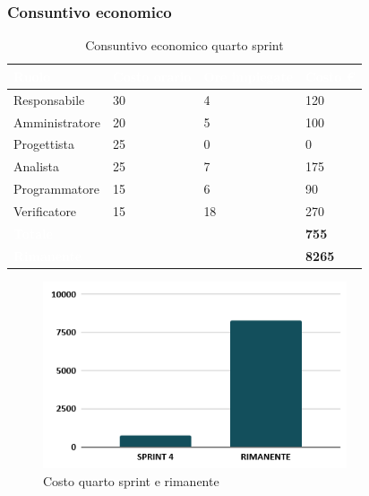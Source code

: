 \newpage
\subsubsection{Consuntivo economico}
{
\setlength{\tabcolsep}{10pt}
\renewcommand{\arraystretch}{1.5}
\begin{table}[h]
    \centering
    \begin{tabularx}{\textwidth}{| l | l | l | X |}
        \hline
        \rowcolor{headerrow} \textbf{\textcolor{white}{Ruolo}} & \textbf{\textcolor{white}{Costo orario}} & \textbf{\textcolor{white}{Ore impiegate}} & \textbf{\textcolor{white}{Costo €}} \\
        \hline
        Responsabile & 30 & 4 & 120\\
        \hline
        Amministratore & 20 & 5 & 100\\
        \hline
        Progettista & 25 & 0 & 0\\
        \hline
        Analista & 25 & 7 & 175\\
        \hline
        Programmatore & 15 & 6 & 90\\
        \hline
        Verificatore & 15 & 18 & 270\\
        \hline
        \cellcolor{headerrow} \textbf{\textcolor{white}{Totale}} &  &  & \textbf{755}\\
        \hline
        \cellcolor{headerrow} \textbf{\textcolor{white}{Rimanente}} &  &  & \textbf{8265}\\
        \hline
    \end{tabularx}
    \caption{Consuntivo economico quarto sprint}
    \label{tab:consuntivocostiquartosprint}
\end{table}
}

\begin{figure}[h!]
    \centering
    \includegraphics[width=0.8\textwidth]{cons4costo.png}
    \caption{Costo quarto sprint e rimanente}
    \label{fig:consuntivocostoquartopsprint}
\end{figure}

